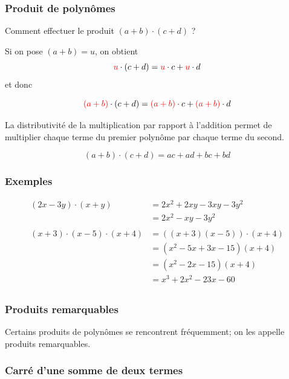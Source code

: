 \documentclass[
  12pt,
]{book}
\begin{document}
\hypertarget{produit-de-polynuxf4mes}{%
\subsubsection{Produit de polynômes}\label{produit-de-polynuxf4mes}}

Comment effectuer le produit \((a+b)\cdot (c+d)\) ?

Si on pose \((a+b)=u\), on obtient \[{\color{red}u}\cdot(c+d) = {\color{red}u}\cdot c + {\color{red}u}\cdot d\]
et donc

\[{\color{red}(a+b)}\cdot(c+d) = {\color{red}(a+b)}\cdot c + {\color{red}(a+b)}\cdot d\]

La distributivité de la multiplication par rapport à l'addition permet de multiplier chaque terme du premier polynôme par chaque terme du second.

\begin{reglebox}
\[(a+b)\cdot(c+d)=ac+ad+bc+bd\]

\end{reglebox}

\hypertarget{exemples-13}{%
\subsubsection*{Exemples}\label{exemples-13}}

\begin{align*}
(2x-3y)\cdot(x+y) & =2x^2+2xy-3xy-3y^2\\
& = 2x^2-xy-3y^2\\
\\
(x+3)\cdot(x-5)\cdot(x+4) &= ((x+3)(x-5))\cdot(x+4)\\
&=(x^2-5x+3x-15)(x+4)\\
&=(x^2-2x-15)(x+4)\\
&=x^3+2x^2-23x-60\\
\end{align*}

\hypertarget{produits-remarquables}{%
\subsubsection{Produits remarquables}\label{produits-remarquables}}

Certains produits de polynômes se rencontrent fréquemment; on les appelle produits remarquables.

\hypertarget{carruxe9-dune-somme-de-deux-termes}{%
\subsubsection*{Carré d'une somme de deux termes}\label{carruxe9-dune-somme-de-deux-termes}}
\end{document}
